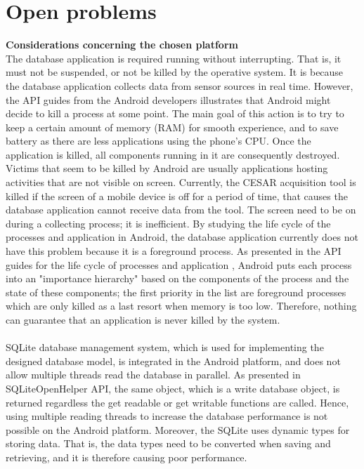 \section{Open problems}
\textbf{Considerations concerning the chosen platform}\\
The database application is required running without interrupting. That is, it must not be suspended, or not be killed by the operative system. It is because the database application collects data from sensor sources in real time. However, the API guides from the Android developers \citep{AndroidAPIProcess} illustrates that Android might decide to kill a process at some point. The main goal of this action is to try to keep a certain amount of memory (RAM) for smooth experience, and to save battery as there are less applications using the phone's CPU. Once the application is killed, all components running in it are consequently destroyed. Victims that seem to be killed by Android are usually applications hosting activities that are not visible on screen. Currently, the CESAR acquisition tool is killed if the screen of a mobile device is off for a period of time, that causes the database application cannot receive data from the tool. The screen need to be on during a collecting process; it is inefficient. By studying the life cycle of the processes and application in Android, the database application currently does not have this problem because it is a foreground process. As presented in the API guides for the life cycle of processes and application \citep{AndroidAPIProcessLifeCycle}, Android puts each process into an "importance hierarchy" based on the components of the process and the state of these components; the first priority in the list are foreground processes which are only killed as a last resort when memory is too low. Therefore, nothing can guarantee that an application is never killed by the system.\\\\
SQLite database management system, which is used for implementing the designed database model, is integrated in the Android platform, and does not allow multiple threads read the database in parallel. As presented in SQLiteOpenHelper API\citep{AndroidAPISQLiteOpen}, the same object, which is a write database object, is returned regardless the get readable or get writable functions are called. Hence, using multiple reading threads to increase the database performance is not possible on the Android platform. Moreover, the SQLite uses dynamic types for storing data. That is, the data types need to be converted when saving and retrieving, and it is therefore causing poor performance.\\\\

